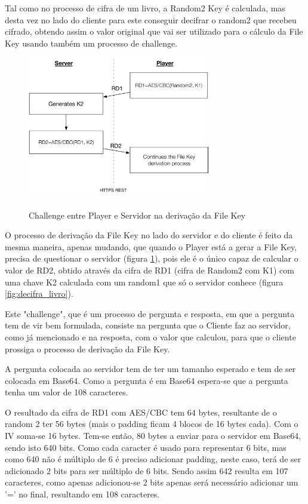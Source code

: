 \documentclass[pdftex,12pt,a4paper]{report}
\begin{document}
Tal como no processo de cifra de um livro, a Random2 Key é calculada, mas desta vez no lado do cliente para este conseguir decifrar o random2 que recebeu cifrado, obtendo assim o valor original que vai ser utilizado para o cálculo da File Key usando também um processo de challenge.

\begin{figure}[!htb]
\center
 \includegraphics[width=80mm,scale=1]{challengefilekey.pdf}
 \caption{\\Challenge entre Player e Servidor na derivação da File Key}
 \label{fig:challange_player_server}
\end{figure}

O processo de derivação da File Key no lado do servidor e do cliente é feito da mesma maneira, apenas mudando, que quando o Player está a gerar a File Key, precisa de questionar o servidor (figura \ref{fig:challange_player_server}), pois ele é o único capaz de calcular o valor de RD2, obtido através da cifra de RD1 (cifra de Random2 com K1) com uma chave K2 calculada com um random1 que só o servidor conhece (figura \ref{fig:decifra_livro}). 

Este "challenge", que é um processo de pergunta e resposta, em que a pergunta tem de vir bem formulada, consiste na pergunta que o Cliente faz ao servidor, como já mencionado e na resposta, com o valor que calculou, para que o cliente prossiga o processo de derivação da File Key. 

A pergunta colocada ao servidor tem de ter um tamanho esperado e tem de ser colocada em Base64. Como a pergunta é em Base64 espera-se que a pergunta tenha um valor de 108 caracteres. 

O resultado da cifra de RD1 com AES/CBC tem 64 bytes, resultante de o random 2 ter 56 bytes (mais o padding ficam 4 blocos de 16 bytes cada). Com o IV soma-se 16 bytes. Tem-se então, 80 bytes a enviar para o servidor em Base64, sendo isto 640 bits. Como cada caracter é usado para representar 6 bits, mas como 640 não é múltiplo de 6 é preciso adicionar padding, neste caso, terá de ser adicionado 2 bits para ser múltiplo de 6 bits. Sendo assim 642 resulta em 107 caracteres, como apenas adicionou-se 2 bits apenas será necessário adicionar um '=' no final, resultando em 108 caracteres.
\end{document}
